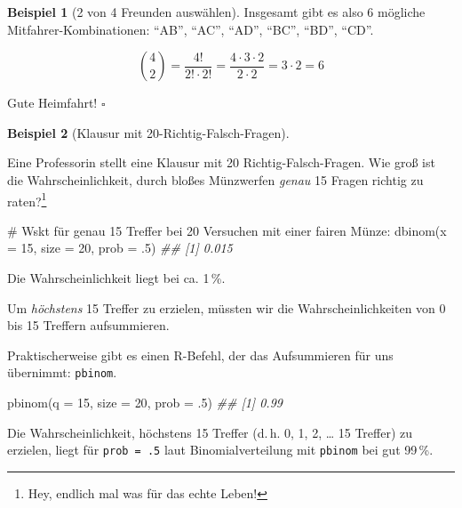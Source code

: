 \documentclass[
  ngerman,
  letterpaper,
  twoside,
  open=any]{scrbook}
\newenvironment{Shaded}{\begin{snugshade}}{\end{snugshade}}
\newcommand{\AttributeTok}[1]{\textcolor[rgb]{0.40,0.45,0.13}{#1}}
\newcommand{\CommentTok}[1]{\textcolor[rgb]{0.37,0.37,0.37}{#1}}
\newcommand{\DecValTok}[1]{\textcolor[rgb]{0.68,0.00,0.00}{#1}}
\newcommand{\DocumentationTok}[1]{\textcolor[rgb]{0.37,0.37,0.37}{\textit{#1}}}
\newcommand{\FunctionTok}[1]{\textcolor[rgb]{0.28,0.35,0.67}{#1}}
\newcommand{\NormalTok}[1]{\textcolor[rgb]{0.00,0.23,0.31}{#1}}
\theoremstyle{definition}
\newtheorem{example}{Beispiel}[chapter]
\theoremstyle{plain}
\theoremstyle{definition}
\theoremstyle{definition}
\theoremstyle{definition}
\newtheorem{example}{Beispiel}[chapter]
\theoremstyle{definition}
\theoremstyle{remark}
\begin{document}
\begin{example}[2 von 4 Freunden
auswählen]
Insgesamt gibt es also 6 mögliche Mitfahrer-Kombinationen: \enquote{AB},
\enquote{AC}, \enquote{AD}, \enquote{BC}, \enquote{BD}, \enquote{CD}.

\[\binom{4}{2} = \frac{4!} {2! \cdot 2!} = \frac{4\cdot 3 \cdot 2}{2 \cdot 2} = 3 \cdot 2 = 6\]

Gute Heimfahrt! \(\square\)

\end{example}

\begin{example}[Klausur mit
20-Richtig-Falsch-Fragen]\protect\hypertarget{exm-klausur20}{}\label{exm-klausur20}

Eine Professorin stellt eine Klausur mit 20 Richtig-Falsch-Fragen. Wie
groß ist die Wahrscheinlichkeit, durch bloßes Münzwerfen \emph{genau} 15
Fragen richtig zu raten?\footnote{Hey, endlich mal was für das echte
  Leben!}

\begin{Shaded}
\begin{Highlighting}[]
\CommentTok{\# Wskt für genau 15 Treffer bei 20 Versuchen mit einer fairen Münze:}
\FunctionTok{dbinom}\NormalTok{(}\AttributeTok{x =} \DecValTok{15}\NormalTok{, }\AttributeTok{size =} \DecValTok{20}\NormalTok{, }\AttributeTok{prob =}\NormalTok{ .}\DecValTok{5}\NormalTok{)}
\DocumentationTok{\#\# [1] 0.015}
\end{Highlighting}
\end{Shaded}

Die Wahrscheinlichkeit liegt bei ca. 1\,\%.

Um \emph{höchstens} 15 Treffer zu erzielen, müssten wir die
Wahrscheinlichkeiten von 0 bis 15 Treffern aufsummieren.

Praktischerweise gibt es einen R-Befehl, der das Aufsummieren für uns
übernimmt: \texttt{pbinom}.

\begin{Shaded}
\begin{Highlighting}[]
\FunctionTok{pbinom}\NormalTok{(}\AttributeTok{q =} \DecValTok{15}\NormalTok{, }\AttributeTok{size =} \DecValTok{20}\NormalTok{, }\AttributeTok{prob =}\NormalTok{ .}\DecValTok{5}\NormalTok{)}
\DocumentationTok{\#\# [1] 0.99}
\end{Highlighting}
\end{Shaded}

Die Wahrscheinlichkeit, höchstens 15 Treffer (d.\,h. 0, 1, 2, \ldots{}
15 Treffer) zu erzielen, liegt für \texttt{prob\ =\ .5} laut
Binomialverteilung mit \texttt{pbinom} bei gut 99\,\%.

\end{example}
\end{document}
